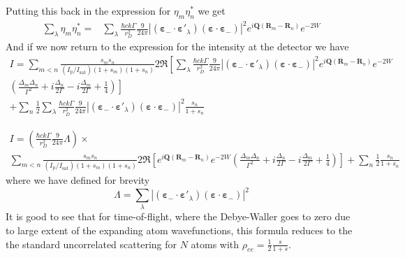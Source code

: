 \documentclass[11pt,letter]{article}
\newcommand{\bv}[1]{\ensuremath{\bm{#1}}}
\begin{document}
Putting this back in the expression for $\eta_{m}\eta_{n}^{*}$ we get
\begin{equation}
\begin{split}
 \sum_{\lambda } \eta_{m}\eta_{n}^{*} = & 
 \sum_{\lambda } \frac{\hbar c k \Gamma}{r_{D}^{2}}  
    \frac{9}{24\pi} 
       | (\bv{\varepsilon}_{-}\cdot \bv{\varepsilon}'_{\lambda} )
                       (\bv{\varepsilon}\cdot \bv{\varepsilon}_{-} ) |^{2}
       e^{ i \bv{Q}( \bv{R}_{m} - \bv{R}_{n} ) } e^{-2W} 
\end{split}
\end{equation}
And if we now return to the expression for the intensity at the detector we have 
\begin{multline}
 I  = 
  \sum_{m<n} 
    \frac{ s_{m} s_{n} } { (I_{\mathrm{p}}/I_{\mathrm{sat}}) ( 1+s_{m} )( 1+s_{n} ) }
    2 \Re\left[ 
         \sum_{\lambda } \frac{\hbar c k \Gamma}{r_{D}^{2}}  
            \frac{9}{24\pi} 
               | (\bv{\varepsilon}_{-}\cdot \bv{\varepsilon}'_{\lambda} )
                               (\bv{\varepsilon}\cdot \bv{\varepsilon}_{-} ) |^{2}
               e^{ i \bv{Q}( \bv{R}_{m} - \bv{R}_{n} ) } e^{-2W} \right. \\ 
    \left.
    \left(
        \frac{ \Delta_{m} \Delta_{n} }{ \Gamma^{2} } 
      + i \frac{ \Delta_{n} }{ 2 \Gamma } 
      - i \frac{ \Delta_{m} }{ 2 \Gamma } 
      + \frac{1}{4}  
    \right) \right] \\ 
  + \sum_{n}  \frac{1}{2}
    \sum_{\lambda} \frac{\hbar c k \Gamma}{r_{D}^{2}}  
    \frac{9}{24\pi} 
       | (\bv{\varepsilon}_{-}\cdot \bv{\varepsilon}'_{\lambda} )
                       (\bv{\varepsilon}\cdot \bv{\varepsilon}_{-} ) |^{2} 
    \frac{ s_{n} } { 1 + s_{n} } 
\end{multline}

\begin{multline}
\label{eq:finalIdetector}
 I  =
 \left( 
 \frac{\hbar c k \Gamma}{r_{D}^{2}}  
     \frac{9}{24\pi} \Lambda 
  \right) \times \\
  \sum_{m<n} 
    \frac{ s_{m} s_{n} } { (I_{\mathrm{p}}/I_{\mathrm{sat}}) ( 1+s_{m} )( 1+s_{n} ) }
    2 \Re\left[ 
               e^{ i \bv{Q}( \bv{R}_{m} - \bv{R}_{n} ) } e^{-2W}  
    \left(
        \frac{ \Delta_{m} \Delta_{n} }{ \Gamma^{2} } 
      + i \frac{ \Delta_{n} }{ 2 \Gamma } 
      - i \frac{ \Delta_{m} }{ 2 \Gamma } 
      + \frac{1}{4}  
    \right) \right]  
  + \sum_{n}  \frac{1}{2}
    \frac{ s_{n} } { 1 + s_{n} } 
\end{multline}
where we have defined for brevity
\begin{equation}
 \Lambda = 
  \sum_{\lambda }
        | (\bv{\varepsilon}_{-}\cdot \bv{\varepsilon}'_{\lambda} )
                        (\bv{\varepsilon}\cdot \bv{\varepsilon}_{-} ) |^{2} 
\end{equation} 
It is good to see that for time-of-flight, where the Debye-Waller goes to zero due to large extent of the expanding atom wavefunctions,  this formula reduces to the the standard uncorrelated scattering for $N$ atoms with $\rho_{ee} = \frac{1}{2} \frac{s}{1+s}$.
\end{document}
